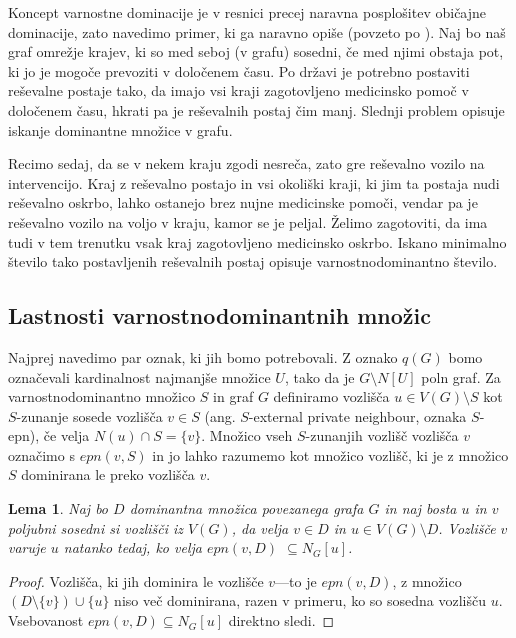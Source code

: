 \documentclass[12pt,a4paper,twoside]{article}
\theoremstyle{definition} %
\theoremstyle{plain} %
\newtheorem{lema}[definicija]{Lema}
\numberwithin{equation}{section}  %
\begin{document}
Koncept varnostne dominacije je v resnici precej naravna posplošitev običajne dominacije, zato navedimo primer, ki ga naravno opiše (povzeto po \cite{pavlic2010rimsko}). Naj bo naš graf omrežje krajev, ki so med seboj (v grafu) sosedni, če med njimi obstaja pot, ki jo je mogoče prevoziti v določenem času. Po državi je potrebno postaviti reševalne postaje tako, da imajo vsi kraji zagotovljeno medicinsko pomoč v določenem času, hkrati pa je reševalnih postaj čim manj. Slednji problem opisuje iskanje dominantne množice v grafu.

Recimo sedaj, da se v nekem kraju zgodi nesreča, zato gre reševalno vozilo na intervencijo. Kraj z reševalno postajo in vsi okoliški kraji, ki jim ta postaja nudi reševalno oskrbo, lahko ostanejo brez nujne medicinske pomoči, vendar pa je reševalno vozilo na voljo v kraju, kamor se je peljal. Želimo zagotoviti, da ima tudi v tem trenutku vsak kraj zagotovljeno medicinsko oskrbo. Iskano minimalno število tako postavljenih reševalnih postaj opisuje varnostnodominantno število.

\subsection{Lastnosti varnostnodominantnih množic}
Najprej navedimo par oznak, ki jih bomo potrebovali. Z oznako $q(G)$ bomo označevali kardinalnost najmanjše množice $U$, tako da je $G \setminus N[U]$ poln graf. Za varnostnodominantno množico $S$ in graf $G$ definiramo vozlišča $u \in V(G) \setminus S$ kot $S$-zunanje sosede vozlišča $v \in S$  (ang. $S$-external private neighbour, oznaka $S$-epn), če velja $N(u) \cap S = \{v\}$. Množico vseh $S$-zunanjih vozlišč vozlišča $v$ označimo s \emph{$epn(v, S)$} in jo lahko razumemo kot množico vozlišč, ki je z množico $S$ dominirana le preko vozlišča $v$.

\begin{lema}\label{lemaEPN}
Naj bo $D$ dominantna množica povezanega grafa $G$ in naj bosta $u$ in $v$ poljubni  sosedni si vozlišči iz $V(G)$, da velja $v \in D$ in $u \in V(G) \setminus D$. Vozlišče $v$ varuje $u$ natanko tedaj, ko velja $epn(v, D)$ $\subseteq N_G[u]$. 
\end{lema}

\begin{proof}
Vozlišča, ki jih dominira le vozlišče $v$---to je $epn(v, D)$, z množico $(D \setminus \{v\}) \cup \{u\}$ niso več dominirana, razen v primeru, ko so sosedna vozlišču $u$. Vsebovanost $epn(v, D) \subseteq N_G[u]$ direktno sledi.
\end{proof}
\end{document}
